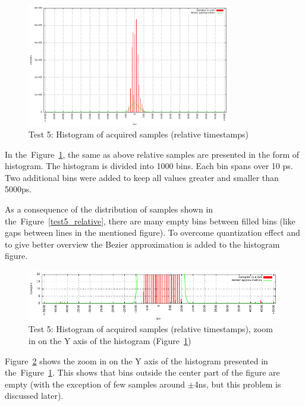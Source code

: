 \documentclass[a4paper, 12pt]{article}
\begin{document}
\FloatBarrier
\begin{figure}[ht!]
  \centering
  \includegraphics[width=0.80\textwidth]{img/test5_histogram.pdf}
  \caption{Test 5: Histogram of acquired samples (relative timestamps)}
  \label{test5_histogram}
\end{figure}

In the~Figure~\ref{test5_histogram}, the same as above relative samples are
presented in the form of histogram. The histogram is divided into 1000 bins.
Each bin spans over 10 ps.
Two additional bins were added to keep all values greater and smaller than
5000ps.

As a consequence of the distribution of samples shown in
the~Figure~\ref{test5_relative}, there are many empty bins between filled bins
(like gaps between lines in the mentioned figure).
To overcome quantization effect and to give better overview
the Bezier approximation is added to the histogram figure.

\begin{figure}[ht!]
  \centering
  \includegraphics[width=1\textwidth]{img/test5_histogram_zoomy.pdf}
  \caption{Test 5: Histogram of acquired samples (relative timestamps), zoom in
           on the Y axis of the histogram (Figure~\ref{test5_histogram})}
  \label{test5_histogram_zoomy}
\end{figure}

Figure~\ref{test5_histogram_zoomy} shows the zoom in on the Y axis of
the histogram presented in the~Figure~\ref{test5_histogram}.
This shows that bins outside the center part of the figure are empty
(with the exception of few samples around $\pm$4ns, but this problem is
discussed later).
\end{document}
